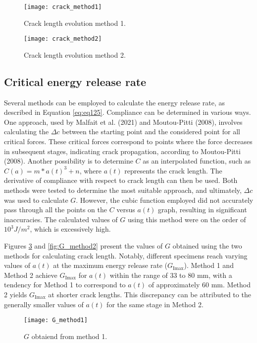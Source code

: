 \begin{figure}[htp]
	\centering
	\texttt{[image: crack\_method1]}
	\caption{Crack length evolution method 1.}
	\label{fig:crack_method1}
\end{figure}

\begin{figure}[htp]
	\centering
	\texttt{[image: crack\_method2]}
	\caption{Crack length evolution method 2.}
	\label{fig:crack_method2}
\end{figure}

\subsection{Critical energy release rate}

Several methods can be employed to calculate the energy release rate, as described in Equation \ref{eq:eq125}. Compliance can be determined in various ways. One approach, used by Malfait et al. (2021) and Moutou-Pitti (2008), involves calculating the $\Delta c$ between the starting point and the considered point for all critical forces. These critical forces correspond to points where the force decreases in subsequent stages, indicating crack propagation, according to Moutou-Pitti (2008). Another possibility is to determine $C$ as an interpolated function, such as $C(a)=m*a(t)^3+n$, where $a(t)$ represents the crack length. The derivative of compliance with respect to crack length can then be used. Both methods were tested to determine the most suitable approach, and ultimately, $\Delta c$ was used to calculate $G$. However, the cubic function employed did not accurately pass through all the points on the $C$ versus $a(t)$ graph, resulting in significant inaccuracies. The calculated values of $G$ using this method were on the order of $10^3 J/m^2$, which is excessively high.

Figures \ref{fig:G_method1} and \ref{fig:G_method2} present the values of $G$ obtained using the two methods for calculating crack length. Notably, different specimens reach varying values of $a(t)$ at the maximum energy release rate ($G_\text{Imax}$). Method 1 and Method 2 achieve $G_\text{Imax}$ for $a(t)$ within the range of 33 to 80 mm, with a tendency for Method 1 to correspond to $a(t)$ of approximately 60 mm. Method 2 yields $G_\text{Imax}$ at shorter crack lengths. This discrepancy can be attributed to the generally smaller values of $a(t)$ for the same stage in Method 2.


\begin{figure}[htp]
	\centering
	\texttt{[image: G\_method1]}
	\caption{$G$ obtaiend from method 1.}
	\label{fig:G_method1}
\end{figure}


